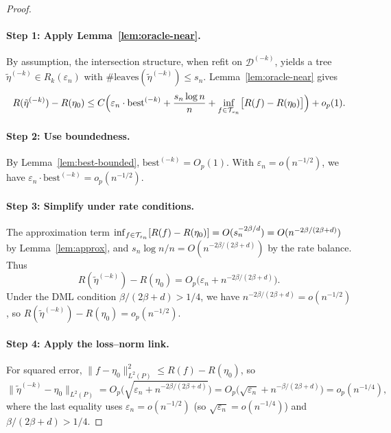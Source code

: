 \documentclass[12pt]{article}
\begin{document}
\begin{proof}
\paragraph{Step 1: Apply Lemma~\ref{lem:oracle-near}.}
By assumption, the intersection structure, when refit on $\mathcal{D}^{(-k)}$, yields a tree $\tilde{\eta}^{(-k)} \in R_k(\varepsilon_n)$ with $\#\text{leaves}(\tilde{\eta}^{(-k)}) \le s_n$. Lemma~\ref{lem:oracle-near} gives
\[
R(\tilde{\eta}^{(-k)}) - R(\eta_0) \le C \Bigl( \varepsilon_n \cdot \text{best}^{(-k)} + \frac{s_n \log n}{n} + \inf_{f \in \mathcal{T}_{s_n}} \bigl[ R(f) - R(\eta_0) \bigr] \Bigr) + o_p(1).
\]

\paragraph{Step 2: Use boundedness.}
By Lemma~\ref{lem:best-bounded}, $\text{best}^{(-k)} = O_p(1)$. With $\varepsilon_n = o(n^{-1/2})$, we have $\varepsilon_n \cdot \text{best}^{(-k)} = o_p(n^{-1/2})$.

\paragraph{Step 3: Simplify under rate conditions.}
The approximation term $\inf_{f \in \mathcal{T}_{s_n}}[R(f) - R(\eta_0)] = O(s_n^{-2\beta/d}) = O(n^{-2\beta/(2\beta+d)})$ by Lemma~\ref{lem:approx}, and $s_n \log n / n = O(n^{-2\beta/(2\beta+d)})$ by the rate balance. Thus
\[
R(\tilde{\eta}^{(-k)}) - R(\eta_0) = O_p\bigl( \varepsilon_n + n^{-2\beta/(2\beta+d)} \bigr).
\]
Under the DML condition $\beta/(2\beta+d) > 1/4$, we have $n^{-2\beta/(2\beta+d)} = o(n^{-1/2})$, so $R(\tilde{\eta}^{(-k)}) - R(\eta_0) = o_p(n^{-1/2})$.

\paragraph{Step 4: Apply the loss--norm link.}
For squared error, $\|f - \eta_0\|_{L^2(P)}^2 \le R(f) - R(\eta_0)$, so
\[
\|\tilde{\eta}^{(-k)} - \eta_0\|_{L^2(P)} = O_p\bigl( \sqrt{\varepsilon_n + n^{-2\beta/(2\beta+d)}} \bigr) = O_p\bigl( \sqrt{\varepsilon_n} + n^{-\beta/(2\beta+d)} \bigr) = o_p(n^{-1/4}),
\]
where the last equality uses $\varepsilon_n = o(n^{-1/2})$ (so $\sqrt{\varepsilon_n} = o(n^{-1/4})$) and $\beta/(2\beta+d) > 1/4$.
\end{proof}
\end{document}

